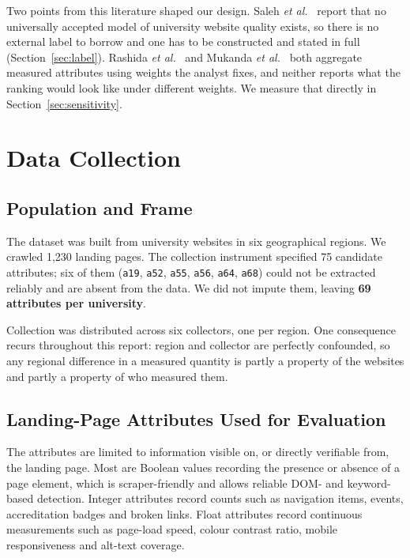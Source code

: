 \documentclass[11pt,a4paper]{article}
\begin{document}


\noindent Two points from this literature shaped our design. Saleh \emph{et al.}~\cite{saleh2022}
report that no universally accepted model of university website quality exists, so there is no
external label to borrow and one has to be constructed and stated in full
(Section~\ref{sec:label}). Rashida \emph{et al.}~\cite{rashida2021} and Mukanda \emph{et
al.}~\cite{mukanda2022} both aggregate measured attributes using weights the analyst fixes, and
neither reports what the ranking would look like under different weights. We measure that directly
in Section~\ref{sec:sensitivity}.

\section{Data Collection}
\label{sec:data}

\subsection{Population and Frame}

The dataset was built from university websites in six geographical regions. We crawled 1,230
landing pages. The collection instrument specified 75 candidate attributes; six of them
(\texttt{a19}, \texttt{a52}, \texttt{a55}, \texttt{a56}, \texttt{a64}, \texttt{a68}) could not be
extracted reliably and are absent from the data. We did not impute them, leaving \textbf{69
attributes per university}.

Collection was distributed across six collectors, one per region. One consequence recurs throughout
this report: region and collector are perfectly confounded, so any regional difference in a measured
quantity is partly a property of the websites and partly a property of who measured them.

\subsection{Landing-Page Attributes Used for Evaluation}

The attributes are limited to information visible on, or directly verifiable from, the landing page.
Most are Boolean values recording the presence or absence of a page element, which is
scraper-friendly and allows reliable DOM- and keyword-based detection. Integer attributes record
counts such as navigation items, events, accreditation badges and broken links. Float attributes
record continuous measurements such as page-load speed, colour contrast ratio, mobile responsiveness
and alt-text coverage.
\end{document}
